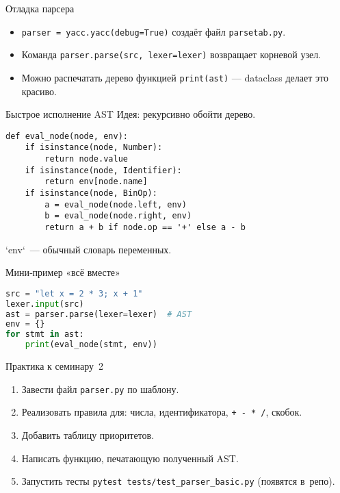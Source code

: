 \documentclass[aspectratio=169]{beamer}
\begin{document}
\begin{frame}[fragile]{Отладка парсера}
	\begin{itemize}
		\item \lstinline|parser = yacc.yacc(debug=True)| создаёт файл \texttt{parsetab.py}.
		\item Команда \lstinline|parser.parse(src, lexer=lexer)| возвращает корневой узел.
		\item Можно распечатать дерево функцией \lstinline|print(ast)| — dataclass делает это красиво.
	\end{itemize}
\end{frame}

\begin{frame}[fragile]{Быстрое исполнение AST}
	Идея: рекурсивно обойти дерево.
	\begin{lstlisting}
def eval_node(node, env):
    if isinstance(node, Number):
        return node.value
    if isinstance(node, Identifier):
        return env[node.name]
    if isinstance(node, BinOp):
        a = eval_node(node.left, env)
        b = eval_node(node.right, env)
        return a + b if node.op == '+' else a - b
\end{lstlisting}
	`env` — обычный словарь переменных.
\end{frame}

\begin{frame}[fragile]{Мини‑пример «всё вместе»}
	\begin{lstlisting}[language=Python]
src = "let x = 2 * 3; x + 1"
lexer.input(src)
ast = parser.parse(lexer=lexer)  # AST
env = {}
for stmt in ast:
    print(eval_node(stmt, env))
\end{lstlisting}
\end{frame}

\begin{frame}[fragile]{Практика к семинару 2}
	\begin{enumerate}
		\item Завести файл \texttt{parser.py} по шаблону.
		\item Реализовать правила для: числа, идентификатора, \texttt{+ - * /}, скобок.
		\item Добавить таблицу приоритетов.
		\item Написать функцию, печатающую полученный AST.
		\item Запустить тесты \texttt{pytest tests/test\_parser\_basic.py} (появятся в репо).
	\end{enumerate}
\end{frame}

\end{document}
